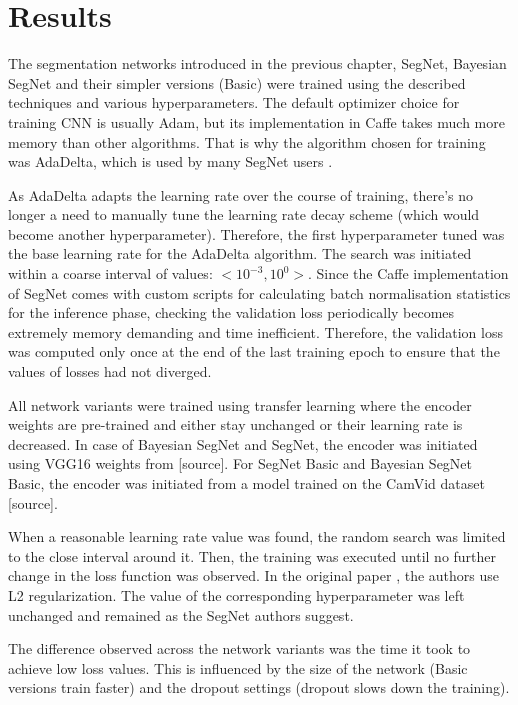 \chapter{Results}

The segmentation networks introduced in the previous chapter, SegNet, Bayesian SegNet and their simpler versions (Basic) were trained using the described techniques and various hyperparameters. The default optimizer choice for training CNN is usually Adam, but its implementation in Caffe takes much more memory than other algorithms. That is why the algorithm chosen for training was AdaDelta, which is used by many SegNet users \cite{aizawan_github}.

As AdaDelta adapts the learning rate over the course of training, there's no longer a need to manually tune the learning rate decay scheme (which would become another hyperparameter). Therefore, the first hyperparameter tuned was the base learning rate for the AdaDelta algorithm. The search was initiated within a coarse interval of values: $ <10^{-3}, 10^{0}>  $. Since the Caffe implementation of SegNet comes with custom scripts for calculating batch normalisation statistics for the inference phase, checking the validation loss periodically becomes extremely memory demanding and time inefficient. Therefore, the validation loss was computed only once at the end of the last training epoch to ensure that the values of losses had not diverged.  

All network variants were trained using transfer learning where the encoder weights are pre-trained and either stay unchanged or their learning rate is decreased. In case of Bayesian SegNet and SegNet, the encoder was initiated using VGG16 weights from [source]. For SegNet Basic and Bayesian SegNet Basic, the encoder was initiated from a model trained on the CamVid dataset [source]. 

When a reasonable learning rate value was found, the random search was limited to the close interval around it. Then, the training was executed until no further change in the loss function was observed. In the original paper \cite{segnet}, the authors use L2 regularization. The value of the corresponding hyperparameter was left unchanged and remained as the SegNet authors suggest.  

The difference observed across the network variants was the time it took to achieve low loss values. This is influenced by the size of the network (Basic versions train faster) and the dropout settings (dropout slows down the training).

